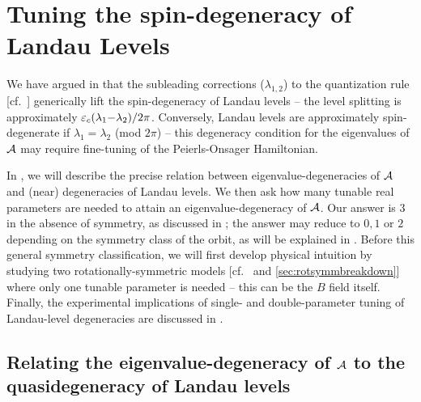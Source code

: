 \documentclass[aps, prb, showpacs, twocolumn, notitlepage, superscriptaddress]{revtex4-1}
\begin{document}


\section{Tuning the spin-degeneracy of Landau Levels}\label{sec:llquasideg}

We have argued in  that the subleading corrections ($\lambda_{1,2}$) to the quantization rule [cf.\ ] generically lift the spin-degeneracy of Landau levels -- the level splitting is approximately $\varepsilon_c(\lambda_1{-}\lambda_2)/2\pi$. Conversely, Landau levels are approximately spin-degenerate if $\lambda_1{=}\lambda_2$ (mod $2\pi$) -- this degeneracy condition for the eigenvalues of ${\cal A}$ may require fine-tuning of the Peierls-Onsager Hamiltonian.  

In , we will describe the precise relation between eigenvalue-degeneracies of  ${\cal A}$ and (near) degeneracies of Landau levels. We then ask how many tunable real parameters are needed to attain an eigenvalue-degeneracy of ${\cal A}$. Our answer is  $3$ in the absence of symmetry, as discussed in ; the answer may reduce to $0,1$ or $2$ depending on the symmetry class of the orbit, as will be explained in . Before this general symmetry classification,  we will first develop physical intuition by studying two rotationally-symmetric models [cf.\  and \ref{sec:rotsymmbreakdown}] where only one tunable parameter is needed -- this can be the $B$ field itself. Finally, the experimental implications of single- and double-parameter tuning of Landau-level degeneracies are discussed in .

\subsection{Relating the eigenvalue-degeneracy of ${\cal A}$ to the quasidegeneracy of Landau levels}
\end{document}
